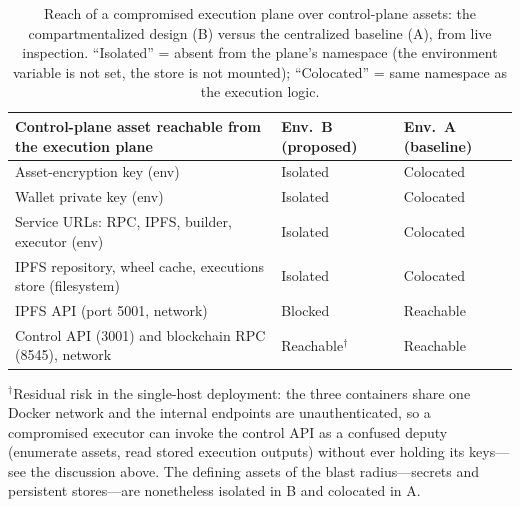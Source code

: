 \begin{table}[htbp]
\centering
\caption{Reach of a compromised execution plane over control-plane assets: the
compartmentalized design (B) versus the centralized baseline (A), from live inspection.
``Isolated'' = absent from the plane's namespace (the environment variable is not set, the
store is not mounted); ``Colocated'' = same namespace as the execution logic.}
\label{tab:blast-radius}
\footnotesize
\begin{tabularx}{\textwidth}{@{}>{\raggedright\arraybackslash}X>{\raggedright\arraybackslash}p{2.4cm}>{\raggedright\arraybackslash}p{2.4cm}@{}}
\toprule
Control-plane asset reachable from the execution plane & Env.~B (proposed) & Env.~A (baseline) \\
\midrule
Asset-encryption key (env) & Isolated & Colocated \\
Wallet private key (env) & Isolated & Colocated \\
Service URLs: RPC, IPFS, builder, executor (env) & Isolated & Colocated \\
IPFS repository, wheel cache, executions store (filesystem) & Isolated & Colocated \\
IPFS API (port 5001, network) & Blocked & Reachable \\
Control API (3001) and blockchain RPC (8545), network & Reachable$^{\dagger}$ & Reachable \\
\bottomrule
\end{tabularx}
\par\smallskip
\parbox{\textwidth}{\footnotesize $^{\dagger}$Residual risk in the single-host deployment:
the three containers share one Docker network and the internal endpoints are
unauthenticated, so a compromised executor can invoke the control API as a confused deputy
(enumerate assets, read stored execution outputs) without ever holding its keys---see the
discussion above. The defining assets of the blast radius---secrets and persistent
stores---are nonetheless isolated in B and colocated in A.}
\end{table}


